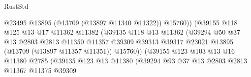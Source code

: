 \begin{lexlean}{RustStd}
\begin{coremodule}
                                            @23495
                                            @13895
                                            (@13709 (@13897 @11340 @11322))
                                            @15760))
                                        (@39155
                                          @118
                                          @125
                                          @13
                                          @17
                                          @11362
                                          @11382
                                          (@39135
                                            @118
                                            @13
                                            @11362
                                            (@39294
                                              @50
                                              @37
                                              @13
                                              @2803
                                              @2813
                                              @11350
                                              @11357
                                              @39309
                                              @39313
                                              @39317
                                              @23021
                                              @13895
                                              (@13709 (@13897 @11357 @11351))
                                              @15760))
                                          (@39155
                                            @123
                                            @103
                                            @13
                                            @16
                                            @11380
                                            @2785
                                            (@39135
                                              @123
                                              @13
                                              @11380
                                              (@39294
                                                @93
                                                @37
                                                @13
                                                @2803
                                                @2813
                                                @11367
                                                @11375
                                                @39309

\end{coremodule}
\end{lexlean}
